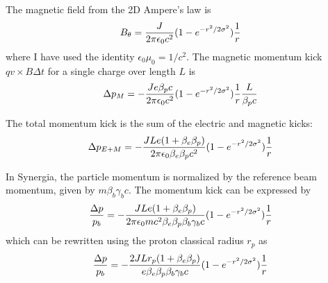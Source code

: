 \documentclass[acus]{jacow}
\begin{document}
The magnetic field from the 2D Ampere's law is
$$
B_\theta = {  J \over {2 \pi \epsilon_0 c^2}} ( 1 - e^{-{{r^2} / {2 \sigma^2}}} )  {1 \over r}
$$
where I have used the identity $\epsilon_0 \mu_0 = 1/c^2$.
The magnetic momentum kick $q v \times B \Delta t$ for a single charge over length $L$ is
$$
\Delta p_M = - {  J e \beta_p c \over {2 \pi \epsilon_0 c^2}} ( 1 - e^{-{{r^2} / {2 \sigma^2}}} )  {1 \over r}{ L \over { \beta_p c }}
$$

The total momentum kick is the sum of the electric and magnetic kicks:
$$
\Delta p_{E+M} = - {  J L e (1 + \beta_e \beta_p) \over {2 \pi \epsilon_0 \beta_e \beta_p c^2}} ( 1 - e^{-{{r^2} / {2 \sigma^2}}} ) {1 \over r}
$$

In Synergia, the particle momentum is normalized by the reference beam momentum, given by $m \beta_b \gamma_b c$.
The momentum kick can be expressed by
$$
{\Delta p \over p_b} = - {  J L e (1 + \beta_e \beta_p) \over {2 \pi \epsilon_0 m c^2 \beta_e \beta_p \beta_b \gamma_b c}} ( 1 - e^{-{{r^2} / {2 \sigma^2}}} ) {1 \over r}
$$
which can be rewritten using the proton classical radius $r_p$ as
$$
{\Delta p \over p_b} = - {  2 J L r_p (1 + \beta_e \beta_p) \over {e \beta_e \beta_p \beta_b \gamma_b c}} ( 1 - e^{-{{r^2} / {2 \sigma^2}}} ) {1 \over r}
$$
\end{document}
